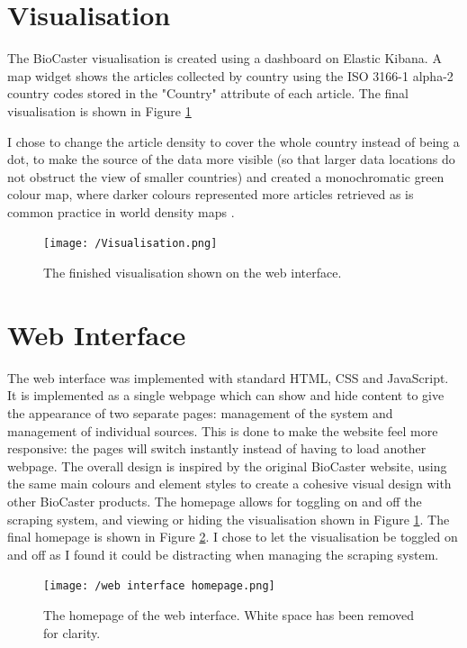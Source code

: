 \documentclass{l4proj}
\begin{document}
\section{Visualisation}
The BioCaster visualisation is created using a dashboard on Elastic Kibana. A map widget shows the articles collected by country using the ISO 3166-1 alpha-2 country codes stored in the "Country" attribute of each article. The final visualisation is shown in Figure \ref{fig:visualisation}

I chose to change the article density to cover the whole country instead of being a dot, to make the source of the data more visible (so that larger data locations do not obstruct the view of smaller countries) and created a monochromatic green colour map, where darker colours represented more articles retrieved as is common practice in world density maps \citep{ourworldindata_density, ons_density}.

\begin{figure}[h]
\texttt{[image: /Visualisation.png]}
\caption{The finished visualisation shown on the web interface.}
\label{fig:visualisation}
\end{figure}


\section{Web Interface}
The web interface was implemented with standard HTML, CSS and JavaScript. It is implemented as a single webpage which can show and hide content to give the appearance of two separate pages: management of the system and management of individual sources. This is done to make the website feel more responsive: the pages will switch instantly instead of having to load another webpage. The overall design is inspired by the original BioCaster website, using the same main colours and element styles to create a cohesive visual design with other BioCaster products. The homepage allows for toggling on and off the scraping system, and viewing or hiding the visualisation shown in Figure \ref{fig:visualisation}. The final homepage is shown in Figure \ref{fig:web-interface-homepage}. I chose to let the visualisation be toggled on and off as I found it could be distracting when managing the scraping system.
\begin{figure}[h]
\centering
\texttt{[image: /web interface homepage.png]}
\caption{The homepage of the web interface. White space has been removed for clarity.}
\label{fig:web-interface-homepage}
\end{figure}
\end{document}
